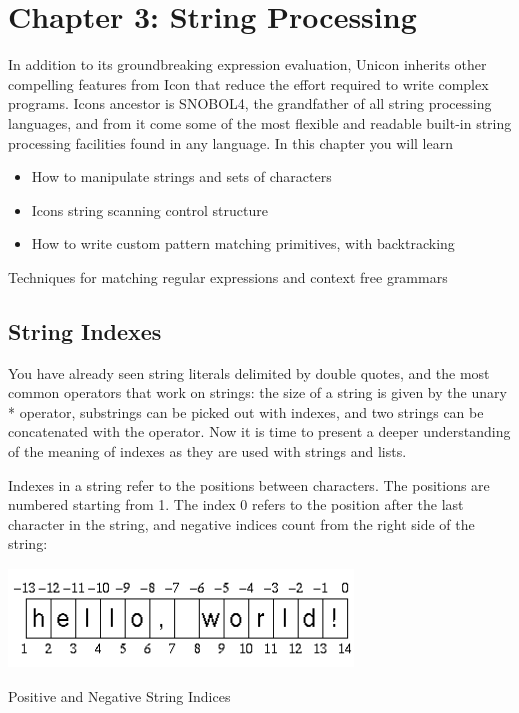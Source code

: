\clearpage\section{Chapter 3: String Processing}

In addition to its groundbreaking expression evaluation, Unicon inherits
other compelling features from Icon that reduce the effort required to
write complex programs. Icon{\textquotesingle}s ancestor is
SNOBOL4, the grandfather of all string processing
languages, and from it come some of the most flexible and readable
built-in string processing facilities found in any language. In this
chapter you will learn

\begin{itemize}
\item How to manipulate strings and sets of characters
\item Icon{\textquotesingle}s string scanning control structure
\item How to write custom pattern matching
primitives, with backtracking
\end{itemize}
Techniques for matching regular expressions and context free grammars

\subsection{String Indexes}

You have already seen string literals delimited by double quotes, and
the most common operators that work on strings: the size of a string is
given by the unary \textsf{*} operator, substrings can be picked out
with indexes, and two strings can be concatenated with the
\textsf{{\textbar}{\textbar}} operator. Now it is time to present a
deeper understanding of the meaning of indexes as they are used with
strings and lists.

Indexes in a string refer to the positions
between characters. The positions are numbered starting from 1. The
index 0 refers to the position after the last character in the string,
and negative indices count from the right side of the string:


\begin{center}
\includegraphics[width=3.6075in,height=1.0417in]{ub-img/ub-img7.png}
\end{center}
\vspace{-0.25cm}{\sffamily\bfseries Figure 3-1:}
{\sffamily Positive and Negative String Indices}

